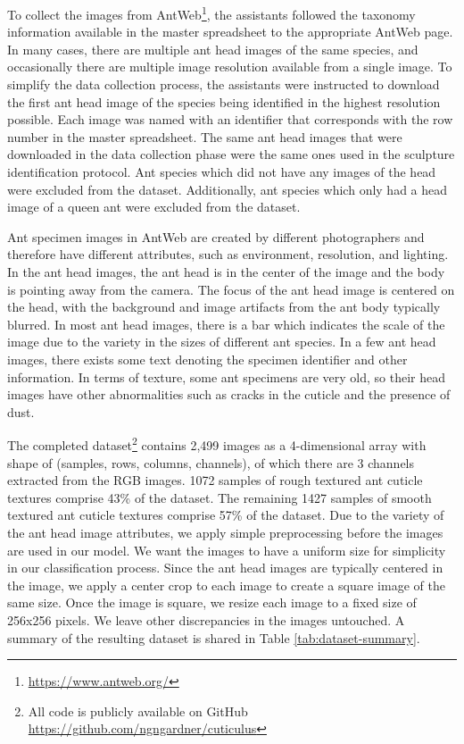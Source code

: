 \documentclass{aci}
\numberwithin{equation}{section}
\begin{document}
To collect the images from AntWeb\footnote{\url{https://www.antweb.org/}}, the
assistants followed the taxonomy information available in the master spreadsheet
to the appropriate AntWeb page. In many cases, there are multiple ant head
images of the same species, and occasionally there are multiple image resolution
available from a single image. To simplify the data collection process, the
assistants were instructed to download the first ant head image of the species
being identified in the highest resolution possible. Each image was named with
an identifier that corresponds with the row number in the master spreadsheet.
The same ant head images that were downloaded in the data collection phase were
the same ones used in the sculpture identification protocol. Ant species which
did not have any images of the head were excluded from the dataset.
Additionally, ant species which only had a head image of a queen ant were
excluded from the dataset.

Ant specimen images in AntWeb \cite{perrichot_antweb_2012} are created by
different photographers and therefore have different attributes, such as
environment, resolution, and lighting. In the ant head images, the ant head is
in the center of the image and the body is pointing away from the camera. The
focus of the ant head image is centered on the head, with the background and
image artifacts from the ant body typically blurred. In most ant head images,
there is a bar which indicates the scale of the image due to the variety in the
sizes of different ant species. In a few ant head images, there exists some text
denoting the specimen identifier and other information. In terms of texture,
some ant specimens are very old, so their head images have other abnormalities
such as cracks in the cuticle and the presence of dust.

The completed dataset\footnote{All code is publicly available on GitHub
    \url{https://github.com/ngngardner/cuticulus}} contains 2,499 images as a
4-dimensional array with shape of (samples, rows, columns, channels), of
which there are 3 channels extracted from the RGB images. 1072 samples of
rough textured ant cuticle textures comprise 43\% of the dataset. The
remaining 1427 samples of smooth textured ant cuticle textures comprise 57\%
of the dataset. Due to the variety of the ant head image attributes, we
apply simple preprocessing before the images are used in our model. We want
the images to have a uniform size for simplicity in our classification
process. Since the ant head images are typically centered in the image, we
apply a center crop to each image to create a square image of the same size.
Once the image is square, we resize each image to a fixed size of 256x256
pixels. We leave other discrepancies in the images untouched. A summary of
the resulting dataset is shared in Table \ref{tab:dataset-summary}.
\end{document}
